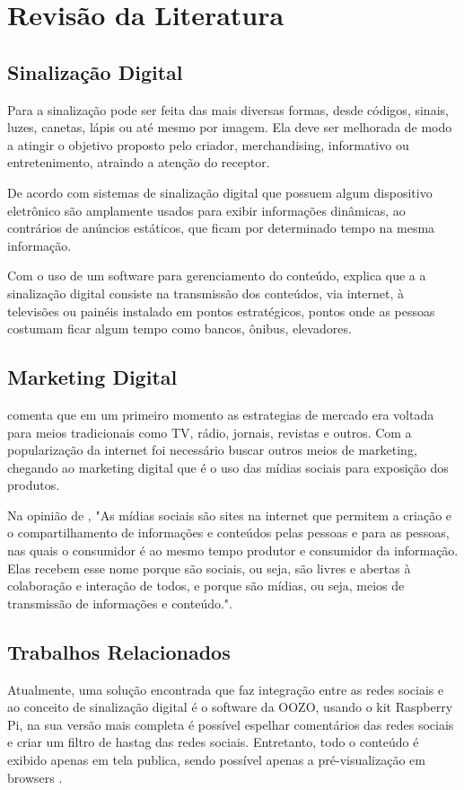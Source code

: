 \documentclass[
	12pt,				%
	openright,			%
	oneside,			%
	a4paper,			%
	english,			%
	french,				%
	spanish,			%
	brazil,				%
	]{abntex2}
\begin{document}
\section*{Revisão da Literatura}
	

	\subsection*{Sinalização Digital}
	Para \cite{munari2006} a sinalização pode ser feita das mais diversas formas, desde códigos, sinais, luzes, canetas, lápis ou até mesmo por imagem. Ela deve ser melhorada de modo a  atingir o objetivo proposto pelo criador, merchandising, informativo ou entretenimento, atraindo a atenção do receptor. 
	
	De acordo com \cite{mishima2016} sistemas de sinalização digital que possuem algum dispositivo eletrônico são amplamente usados para exibir informações dinâmicas, ao contrários de anúncios estáticos, que ficam por determinado tempo na mesma informação. 
	
	Com o uso de um software para gerenciamento do conteúdo, \cite{machado2010} explica que a a sinalização digital consiste na transmissão dos conteúdos, via internet, à televisões ou painéis instalado em pontos estratégicos, pontos onde as pessoas costumam ficar algum tempo como bancos, ônibus, elevadores.
	
	\subsection*{Marketing Digital}
	\cite{santos2014} comenta que em um primeiro momento as estrategias de mercado era voltada para meios tradicionais como TV, rádio, jornais, revistas e outros. Com a popularização da internet foi necessário buscar outros meios de marketing, chegando ao marketing digital que é o uso das mídias sociais para exposição dos produtos.
	
	Na opinião de \cite{torres2000}, "As mídias sociais são sites na internet que permitem a criação e o compartilhamento de informações e conteúdos pelas pessoas e para as pessoas, nas quais o consumidor é ao mesmo tempo produtor e consumidor da informação. Elas recebem esse nome porque são sociais, ou seja, são livres e abertas à colaboração e interação de todos, e porque são mídias, ou seja, meios de transmissão de informações e conteúdo.". 
	
	\subsection*{Trabalhos Relacionados}
	Atualmente, uma solução encontrada que faz integração entre as redes sociais e ao conceito de sinalização digital é o software da OOZO, usando o kit Raspberry Pi, na sua versão mais completa é possível espelhar comentários das redes sociais e criar um filtro de hastag das redes sociais. Entretanto, todo o conteúdo é exibido apenas em tela publica, sendo possível apenas a pré-visualização em browsers \cite{oozo2017}.
	
\end{document}
